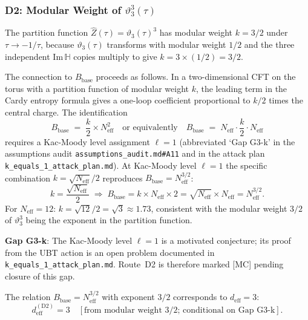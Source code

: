 \documentclass[12pt,a4paper]{article}
\theoremstyle{definition}
\theoremstyle{remark}
\begin{document}
\subsubsection*{D2: Modular Weight of $\vartheta_3^3(\tau)$}

The partition function $\widehat{Z}(\tau) = \vartheta_3(\tau)^3$ has modular
weight $k = 3/2$ under $\tau\to-1/\tau$, because $\vartheta_3(\tau)$ transforms
with modular weight $1/2$ and the three independent Im$\,\mathbb{H}$ copies
multiply to give $k = 3\times(1/2) = 3/2$.

The connection to $B_{\mathrm{base}}$ proceeds as follows.  In a two-dimensional
CFT on the torus with a partition function of modular weight $k$, the leading
term in the Cardy entropy formula gives a one-loop coefficient proportional to
$k/2$ times the central charge.  The identification
\begin{equation}
  B_{\mathrm{base}} \;=\; \frac{k}{2} \times N_{\mathrm{eff}}^2
  \quad\text{or equivalently}\quad
  B_{\mathrm{base}} \;=\; N_{\mathrm{eff}} \cdot \frac{k}{2} \cdot N_{\mathrm{eff}}
\end{equation}
requires a Kac-Moody level assignment $\ell = 1$ (abbreviated `Gap G3-k'
in the assumptions audit \texttt{assumptions\_audit.md\#A11} and in the
attack plan \texttt{k\_equals\_1\_attack\_plan.md}).  At Kac-Moody level
$\ell = 1$ the specific combination $k = \sqrt{N_{\mathrm{eff}}}/2$ reproduces
$B_{\mathrm{base}} = N_{\mathrm{eff}}^{3/2}$:
\begin{equation}
  k = \frac{\sqrt{N_{\mathrm{eff}}}}{2}
  \;\Rightarrow\;
  B_{\mathrm{base}} = k \times N_{\mathrm{eff}} \times 2 = \sqrt{N_{\mathrm{eff}}} \times N_{\mathrm{eff}}
  = N_{\mathrm{eff}}^{3/2}.
\end{equation}
For $N_{\mathrm{eff}} = 12$: $k = \sqrt{12}/2 = \sqrt{3} \approx 1.73$, consistent
with the modular weight $3/2$ of $\vartheta_3^3$ being the exponent in the
partition function.

\begin{gapbox}
\textbf{Gap G3-k}: The Kac-Moody level $\ell = 1$ is a motivated conjecture; its
proof from the UBT action is an open problem documented in
\texttt{k\_equals\_1\_attack\_plan.md}.  Route~D2 is therefore marked [MC] pending
closure of this gap.
\end{gapbox}

The relation $B_{\mathrm{base}} = N_{\mathrm{eff}}^{3/2}$ with exponent $3/2$
corresponds to $d_{\mathrm{eff}} = 3$:
\begin{equation}
  d_{\mathrm{eff}}^{(\mathrm{D2})} = 3 \quad [\text{from modular weight 3/2; conditional on Gap G3-k}].
\end{equation}
\end{document}
